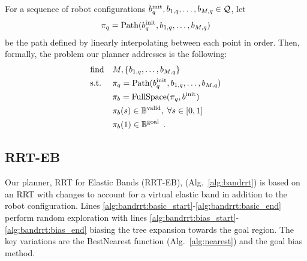 For a sequence of robot configurations $b^\textrm{init}_q, b_{1,q}, \dots, b_{M,q} \in \mathcal{Q}$, let 
\begin{equation}
    \pi_{q} = \textrm{Path}(b^\textrm{init}_q, b_{1,q}, \dots, b_{M,q})
\end{equation}
be the path defined by linearly interpolating between each point in order. Then, formally, the problem our planner addresses is the following:
\begin{equation}
    \begin{aligned}
        & \text{find}   & & M, \{ b_{1,q}, \dots, b_{M,q} \} \\
        & \text{s.t.}   & & \pi_{q} = \textrm{Path}(b^\textrm{init}_q, b_{1,q}, \dots, b_{M,q}) \\
        &               & & \pi_{b} = \textrm{FullSpace}(\pi_{q}, b^\textrm{init}) \\
        &               & & \pi_{b}(s) \in \mathbb{B}^\textrm{valid}, \; \forall s \in [0, 1] \\
        &               & & \pi_{b}(1) \in \mathbb{B}^\textrm{goal} \enspace . \\
    \end{aligned}
    \label{eqn:planning_problemstatement}
\end{equation}


\subsection{RRT-EB}

Our planner, RRT for Elastic Bands (RRT-EB), (Alg.~\ref{alg:bandrrt}) is based on an RRT with changes to account for a virtual elastic band in addition to the robot configuration. Lines \ref{alg:bandrrt:basic_start}-\ref{alg:bandrrt:basic_end} perform random exploration with lines \ref{alg:bandrrt:bias_start}-\ref{alg:bandrrt:bias_end} biasing the tree expansion towards the goal region. The key variations are the BestNearest function (Alg.~\ref{alg:nearest}) and the goal bias method.

